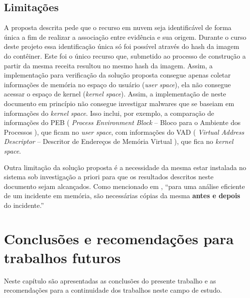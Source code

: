 \section{Limitações}
\label{sec:proposta-limit}

A proposta descrita pede que o recurso em nuvem seja identificável de forma única a fim de realizar a associação entre evidência e sua origem.
%
Durante o curso deste projeto essa identificação única só foi possível através do hash da imagem do contêiner. Este foi o único recurso que, submetido ao processo de construção a partir da mesma receita resultou no mesmo hash da imagem.
%
Assim, a implementação para verificação da solução proposta consegue apenas coletar informações de memória no espaço do usuário (\textit{user space}), ela não consegue acessar o espaço de kernel (\textit{kernel space}). 
%
Assim, a implementação de \fancyname neste documento em princípio não consegue investigar malwares que se baseiam em informações do \textit{kernel space}.
%
Isso inclui, por exemplo, a comparação de informações do PEB ( \textit{Process Environment Block} -- Bloco para o Ambiente dos Processos ), que ficam no \textit{user space}, com informações do VAD ( \textit{Virtual Address Descriptor} -- Descritor de Endereços de Memória Virtual ), que fica no \textit{kernel space}. 
%

%
Outra limitação da solução proposta é a necessidade da mesma estar instalada no sistema sob investigação a priori para que os resultados descritos neste documento sejam alcançados. 
%
Como mencionado em \cite{CaseMemoryForensics:2014}, ``para uma análise eficiente de um incidente em memória, são necessárias cópias da mesma \textbf{antes e depois} do incidente.''

\chapter{Conclusões e recomendações para trabalhos futuros}
\label{sec:proposta-concl-recom}

%
Neste capítulo são apresentadas as conclusões do presente trabalho e as recomendações para a continuidade dos trabalhos neste campo de estudo.

